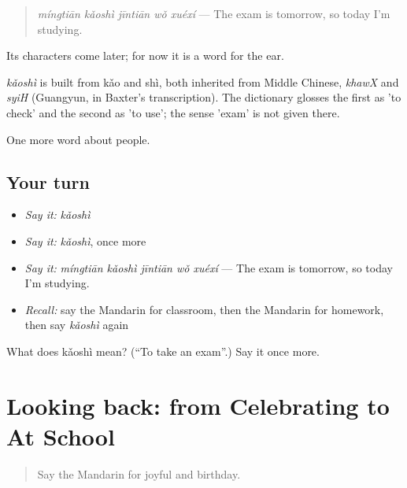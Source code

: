 \begin{quote}
\emph{míngtiān kǎoshì jīntiān wǒ xuéxí} — The exam is tomorrow, so today I'm studying.
\end{quote}

Its characters come later; for now it is a word for the ear.

\begin{cousinweb}
\emph{kǎoshì} is built from kǎo and shì, both inherited from Middle Chinese, \emph{khawX} and \emph{syiH} (Guangyun, in Baxter's transcription). The dictionary glosses the first as 'to check' and the second as 'to use'; the sense 'exam' is not given there.
\end{cousinweb}

\begin{grammarlens}[title={What you've built}]
One more word about people.
\end{grammarlens}

\subsection*{Your turn}
\begin{itemize}
\raggedright
  \item \emph{Say it:} \emph{kǎoshì}
  \item \emph{Say it:} \emph{kǎoshì}, once more
  \item \emph{Say it:} \emph{míngtiān kǎoshì jīntiān wǒ xuéxí} — The exam is tomorrow, so today I'm studying.
  \item \emph{Recall:} say the Mandarin for classroom, then the Mandarin for homework, then say \emph{kǎoshì} again
\end{itemize}

\begin{tcolorbox}[breakable,colback=teal!4,colframe=teal!35!black,title={Before you move on}]
What does kǎoshì mean? (\textquotedblleft{}To take an exam\textquotedblright{}.) Say it once more.
\end{tcolorbox}
\section[(dialogue)]{Looking back: from Celebrating to At School}

\label{lesson:ZH-R79-review-75-79}



\begin{quote}
Say the Mandarin for joyful and birthday.
\end{quote}

